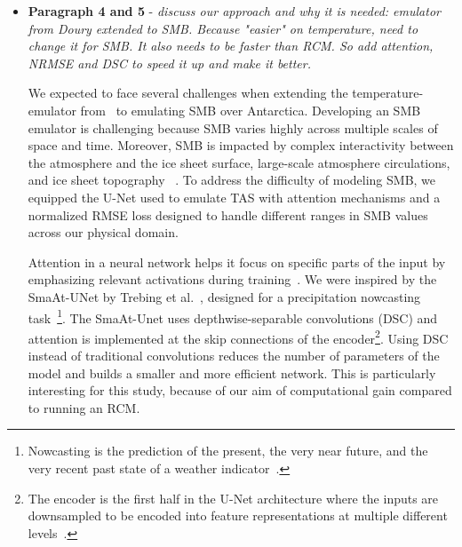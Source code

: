 \documentclass[a4paper,11pt,oneside]{report}
\begin{document}
\begin{itemize}

    \item \textbf{Paragraph 4 and 5} - \textit{discuss our approach and why it is needed: emulator from Doury extended to SMB. Because "easier" on temperature, need to change it for SMB. It also needs to be faster than RCM. So add attention, NRMSE and DSC to speed it up and make it better.}
    
    We expected to face several challenges when extending the temperature-emulator from~\cite{Doury} to emulating SMB over Antarctica. Developing an SMB emulator is challenging because SMB varies highly across multiple scales of space and time. Moreover, SMB is impacted by complex interactivity between the atmosphere and the ice sheet surface, large-scale atmosphere circulations, and ice sheet topography ~\cite{Lenaerts2019}. To address the difficulty of modeling SMB, we equipped the U-Net used to emulate TAS with attention mechanisms and a normalized RMSE loss designed to handle different ranges in SMB values across our physical domain. 
    
    Attention in a neural network helps it focus on specific parts of the input by emphasizing relevant activations during training~\cite{Sanghyun2018, AttentionUNet, Oktay2018}. We were inspired by the SmaAt-UNet by Trebing et al.~\cite{smatunet}, designed for a precipitation nowcasting task~\footnote{Nowcasting is the prediction of the present, the very near future, and the very recent past state of a weather indicator~\cite{Nowcasting}.}. The SmaAt-Unet uses depthwise-separable convolutions (DSC) and attention is implemented at the skip connections of the encoder\footnote{The encoder is the first half in the U-Net architecture where the inputs are downsampled to be encoded into feature representations at multiple different levels~\cite{encoder}.}. Using DSC instead of traditional convolutions reduces the number of parameters of the model and builds a smaller and more efficient network. This is particularly interesting for this study, because of our aim of computational gain compared to running an RCM.     
    

\end{itemize}
\end{document}
